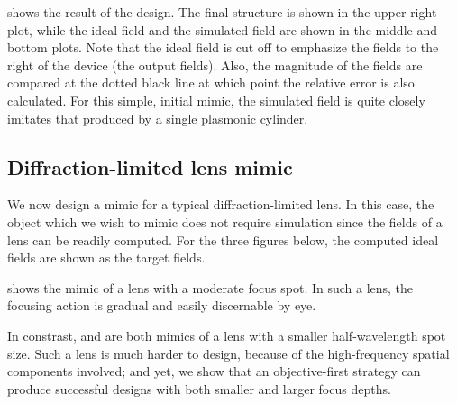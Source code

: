  shows the result of the design.
The final structure is shown in the upper right plot,
    while the ideal field and the simulated field
    are shown in the middle and bottom plots.
Note that the ideal field is cut off to emphasize 
    the fields to the right of the device (the output fields).
Also, the magnitude of the fields are compared at the 
    dotted black line at which point the relative error
    is also calculated.
For this simple, initial mimic, the simulated field is
    quite closely imitates that produced by a single plasmonic cylinder.

\subsection{Diffraction-limited lens mimic}
We now design a mimic for a typical diffraction-limited lens.
In this case, the object which we wish to mimic does not require simulation
    since the fields of a lens can be readily computed.
For the three figures below, 
    the computed ideal fields are shown as the target fields.

 shows the mimic of a lens with a moderate focus spot. 
In such a lens, the focusing action is gradual and easily discernable
    by eye.


In constrast,  and  are both mimics of
    a lens with a smaller half-wavelength spot size.
Such a lens is much harder to design, 
    because of the high-frequency spatial components involved;
    and yet, we show that an objective-first strategy can 
    produce successful designs with both smaller and larger focus depths.
\clearpage

